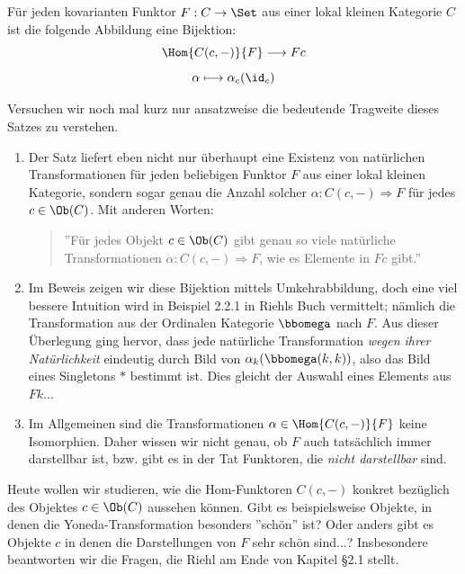 \documentclass[11pt]{article}
\begin{document}
\begin{theorem}  Für jeden kovarianten Funktor $F:C \to \Set$ aus einer lokal kleinen Kategorie $C$ ist die folgende Abbildung eine Bijektion:
$$\Hom{C(c,-)}{F}\longrightarrow Fc$$
$$\alpha \longmapsto \alpha_c(\id_c)$$
\end{theorem}

\begin{note} Versuchen wir noch mal kurz nur ansatzweise die bedeutende Tragweite dieses Satzes zu verstehen.
\begin{enumerate}[label=-]
    \item Der Satz liefert eben nicht nur überhaupt eine Existenz von natürlichen Transformationen für jeden beliebigen Funktor $F$ aus einer lokal kleinen Kategorie, sondern sogar genau die Anzahl solcher $\alpha: C(c,-)\Longrightarrow F$ für jedes $c\in \Ob(C)$. Mit anderen Worten:
    \begin{quote}
        ''Für jedes Objekt $c\in \Ob(C)$ gibt genau so viele natürliche Transformationen $\alpha: C(c,-)\Longrightarrow F$, wie es Elemente in $Fc$ gibt.''
    \end{quote}
    \item Im Beweis zeigen wir diese Bijektion mittels Umkehrabbildung, doch eine viel bessere Intuition wird in Beispiel 2.2.1 in Riehls Buch vermittelt; nämlich die Transformation aus der Ordinalen Kategorie $\bbomega$ nach $F$. Aus dieser Überlegung ging hervor, dass jede natürliche Transformation \emph{wegen ihrer Natürlichkeit} eindeutig durch Bild von $\alpha_k(\bbomega(k,k))$, also das Bild eines Singletons $*$ bestimmt ist.
    Dies gleicht der Auswahl eines Elements aus $Fk$...
    \item[\textbf{!}] Im Allgemeinen sind die Transformationen $\alpha\in \Hom{C(c,-)}{F}$ keine Isomorphien. Daher wissen wir nicht genau, ob $F$ auch tatsächlich immer darstellbar ist, bzw. gibt es in der Tat Funktoren, die \emph{nicht darstellbar} sind.
\end{enumerate}
\end{note}

Heute wollen wir studieren, wie die Hom-Funktoren $C(c,-)$ konkret bezüglich des Objektes $c\in \Ob(C)$ aussehen können. Gibt es beispielsweise Objekte, in denen die Yoneda-Transformation besonders ''schön'' ist? Oder anders gibt es Objekte $c$ in denen die Darstellungen von $F$ sehr schön sind...?
Insbesondere beantworten wir die Fragen, die Riehl am Ende von Kapitel §2.1 stellt.
\end{document}
